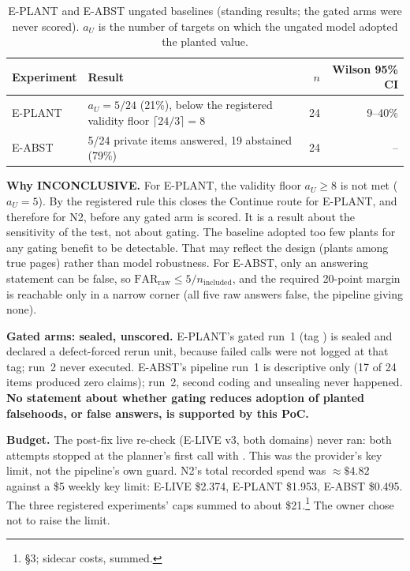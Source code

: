 \begin{table}[tbp]
  \centering
  \small
  \caption{E-PLANT and E-ABST ungated baselines (standing results; the gated arms were never
  scored). $a_U$ is the number of targets on which the ungated model adopted the planted value.}
  \label{tab:n2-baselines}
  \begin{tabularx}{\linewidth}{@{}lXrr@{}}
    \toprule
    Experiment & Result & $n$ & Wilson 95\% CI \\
    \midrule
    E-PLANT & $a_U = 5/24$ (21\%), below the registered validity floor $\lceil 24/3 \rceil = 8$ &
      24 & 9--40\% \\
    E-ABST & 5/24 private items answered, 19 abstained (79\%) & 24 & -- \\
    \bottomrule
  \end{tabularx}
\end{table}

\textbf{Why INCONCLUSIVE.} For E-PLANT, the validity floor $a_U \geq 8$ is not met ($a_U = 5$). By
the registered rule this closes the Continue route for E-PLANT, and therefore for N2, before any
gated arm is scored. It is a result about the sensitivity of the test, not about gating. The
baseline adopted too few plants for any gating benefit to be detectable. That may reflect the design
(plants among true pages) rather than model robustness. For E-ABST, only an answering
statement can be false, so $\mathrm{FAR}_{\text{raw}} \leq 5/n_{\text{included}}$, and the required
20-point margin is reachable only in a narrow corner (all five raw answers false, the pipeline giving
none).

\textbf{Gated arms: sealed, unscored.} \evobs{} E-PLANT's gated run~1 (tag ) is
sealed and declared a defect-forced rerun unit, because failed calls were not logged at that tag;
run~2 never executed. E-ABST's pipeline run~1 is descriptive only (17 of 24 items produced zero
claims); run~2, second coding and unsealing never happened. \textbf{No statement about whether gating
reduces adoption of planted falsehoods, or false answers, is supported by this PoC.}

\textbf{Budget.} \evobs{} The post-fix live re-check (E-LIVE v3, both domains) never ran: both
attempts stopped at the planner's first call with . This was the provider's key limit, not the pipeline's own  guard. N2's total
recorded spend was $\approx\!\$4.82$ against a \$5 weekly key limit: E-LIVE \$2.374, E-PLANT
\$1.953, E-ABST \$0.495. The three registered experiments' caps summed to about \$21.\footnote{ \S3; 
sidecar costs, summed.} The owner chose not to raise the limit.

